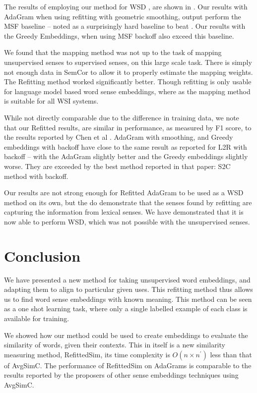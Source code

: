 \documentclass{sig-alternate}
\begin{document}
The results of employing our method for WSD , are shown in . Our results with AdaGram when using refitting with geometric smoothing, output perform the MSF baseline -- noted as a surprisingly hard baseline to beat \parencite{Chen2014}. Our results with the Greedy Embeddings, when using MSF backoff also exceed this baseline.

We found that the mapping method\parencite{agirre2006}  was not up to the task of mapping unsupervised senses to supervised senses, on this large scale task. There is simply not enough data in SemCor to allow it to properly estimate the mapping weights. The Refitting method worked significantly better. Though refitting is only usable for language model based word sense embeddings, where as the mapping method is suitable for all WSI systems.

While not directly comparable due to the difference in training data, we note that our Refitted results, are similar in performance, as measured by F1 score, to the results reported by Chen et al \parencite{Chen2014}.
AdaGram with smoothing, and Greedy embeddings with backoff have close to the same result as reported for L2R with backoff -- with the AdaGram slightly better and the Greedy embeddings slightly worse. They are exceeded by the best method reported in that paper: S2C method with backoff.

Our results are not strong enough for Refitted AdaGram to be used as a WSD method on its own, but the do demonstrate that the senses found by refitting are capturing the information from lexical senses. We have demonstrated that it is now able to perform WSD, which was not possible with the unsupervised senses. 

\section{Conclusion}\label{conclusion}

We have presented a new method for taking unsupervised word embeddings, and adapting them to align to particular given uses. This refitting method thus allows us to find word sense embeddings with known meaning. This method can be seen as a one shot learning task, where only a single labelled example of each class is available for training.

We showed how our method could be used to create embeddings to evaluate the similarity of words, given their contexts. This in itself is a new similarity measuring method, RefittedSim, its time complexity is $O(n \times n^\prime)$ less than that of AvgSimC. The performance of RefittedSim on AdaGrams is comparable to the results reported by the proposers of other sense embeddings techniques using AvgSimC.
\end{document}
